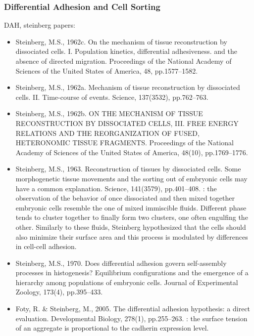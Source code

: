 \subsubsection{Differential Adhesion and Cell Sorting}

  DAH, steinberg papers: 
\begin{itemize}
	\item Steinberg, M.S., 1962c. On the mechanism of tissue reconstruction by dissociated cells. I. Population kinetics, differential adhesiveness. and the absence of directed migration. Proceedings of the National Academy of Sciences of the United States of America, 48, pp.1577–1582. \cite{Steinberg:1962ww}
	\item Steinberg, M.S., 1962a. Mechanism of tissue reconstruction by dissociated cells. II. Time-course of events. Science, 137(3532), pp.762–763. \cite{Steinberg:1962tn}
	\item Steinberg, M.S., 1962b. ON THE MECHANISM OF TISSUE RECONSTRUCTION BY DISSOCIATED CELLS, III. FREE ENERGY RELATIONS AND THE REORGANIZATION OF FUSED, HETERONOMIC TISSUE FRAGMENTS. Proceedings of the National Academy of Sciences of the United States of America, 48(10), pp.1769–1776. \cite{Steinberg:1962us}
	\item Steinberg, M.S., 1963. Reconstruction of tissues by dissociated cells. Some morphogenetic tissue movements and the sorting out of embryonic cells may have a common explanation. Science, 141(3579), pp.401–408. \cite{Steinberg:1963tu}: the observation of the behavior of once dissociated and then mixed together embryonic cells resemble the one of mixed immiscible fluids. Different phase tends to cluster together to finally form two clusters, one often engulfing the other. Similarly to these fluids, Steinberg hypothesized that the cells should also minimize their surface area and this process is modulated by differences in cell-cell adhesion.   
	\item Steinberg, M.S., 1970. Does differential adhesion govern self-assembly processes in histogenesis? Equilibrium configurations and the emergence of a hierarchy among populations of embryonic cells. Journal of Experimental Zoology, 173(4), pp.395–433. 
	\item Foty, R. \& Steinberg, M., 2005. The differential adhesion hypothesis: a direct evaluation. Developmental Biology, 278(1), pp.255–263. \cite{Foty:2005wp}: the surface tension of an aggregate is proportional to the cadherin expression level.
\end{itemize}

